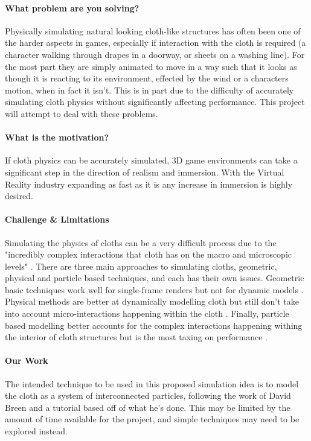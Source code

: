 \documentclass[conference,backref=page]{acmsiggraph}
\begin{document}
	\paragraph{What problem are you solving?}
	Physically simulating natural looking cloth-like structures has often been one of the harder aspects in games, especially if interaction with the cloth is required (a character walking through drapes in a doorway, or sheets on a washing line). For the most part they are simply animated to move in a way such that it looks as though it is reacting to its environment, effected by the wind or a characters motion, when in fact it isn't. This is in part due to the difficulty of accurately simulating cloth physics without significantly affecting performance. This project will attempt to deal with these problems.
	
	
	\paragraph{What is the motivation?}
	If cloth physics can be accurately simulated, 3D game environments can take a significant step in the direction of realism and immersion. With the Virtual Reality industry expanding as fast as it is any increase in immersion is highly desired.
	
	\paragraph{Challenge \& Limitations}
	Simulating the physics of cloths can be a very difficult process due to the "incredibly complex interactions that cloth has on the macro and microscopic levels" \cite{kristopher}. There are three main approaches to simulating cloths, geometric, physical and particle based techniques, and each has their own issues. Geometric basic techniques work well for single-frame renders but not for dynamic models \cite{Weil}. Physical methods are better at dynamically modelling cloth but still don't take into account micro-interactions happening within the cloth \cite{Feynman}. Finally, particle based modelling better accounts for the complex interactions happening withing the interior of cloth structures but is the most taxing on performance \cite{Breen}.
	
	\paragraph{Our Work}
	The intended technique to be used in this proposed simulation idea is to model the cloth as a system of interconnected particles, following the work of David Breen and a tutorial based off of what he's done. This may be limited by the amount of time available for the project, and simple techniques may need to be explored instead.
	
\end{document}
